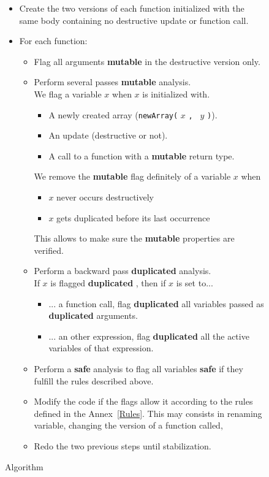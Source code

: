 \documentclass[12pt,a4paper]{article}
\newcommand{\cl}[1]{\texttt{#1}}
\newcommand{\bang}{\textbf{mutable }}
\newcommand{\safe}{\textbf{safe }}
\newcommand{\dupl}{\textbf{duplicated }}
\begin{document}
\begin{figure}[!ht]
\begin{itemize}
\item Create the two versions of each function initialized with the same body containing no destructive update or function call.

\item For each function:
\begin{itemize}
\item Flag all arguments \bang in the destructive version only.

\item Perform several passes \bang analysis.\\
We flag a variable $x$ when $x$ is initialized with.
  \begin{itemize}
    \item A newly created array (\cl{newArray(} $x$ \cl{, } $y$ \cl{)}).
    \item An update (destructive or not).
    \item A call to a function with a \bang return type.
  \end{itemize}
We remove the \bang flag definitely of a variable $x$ when
  \begin{itemize}
    \item $x$ never occurs destructively
    \item $x$ gets duplicated before its last occurrence
  \end{itemize}
This allows to make sure the \bang properties are verified.

\item Perform a backward pass \dupl analysis.\\
If $x$ is flagged \dupl, then if $x$ is set to...
  \begin{itemize}
    \item ... a function call, flag \dupl all variables passed as \dupl arguments.
    \item ... an other expression, flag \dupl all the active variables of that expression.
  \end{itemize}

\item Perform a \safe analysis to flag all variables \safe if they fulfill the rules described above.

\item Modify the code if the flags allow it according to the rules defined in the Annex~\ref{Rules}. This may consists in renaming variable, changing the version of a function called, 

\item Redo the two previous steps until stabilization.
\end{itemize}
\end{itemize}
\caption{Algorithm}
\label{fig:algo}
\end{figure}
\end{document}
